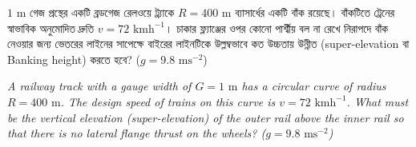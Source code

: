 \documentclass[12pt, a4paper]{article}
\begin{document}
\vspace{1em}
\begin{tcolorbox}[questionbox={প্রশ্ন (Question) 23}]
\noindent
$1\text{ m}$ গেজ প্রস্থের একটি ব্রডগেজ রেলওয়ে ট্র্যাকে $R = 400\text{ m}$ ব্যাসার্ধের একটি বাঁক রয়েছে। বাঁকটিতে ট্রেনের স্বাভাবিক অনুমোদিত দ্রুতি $v = 72\text{ kmh}^{-1}$। চাকার ফ্ল্যাঞ্জের ওপর কোনো পার্শ্বীয় বল না রেখে নিরাপদে বাঁক নেওয়ার জন্য ভেতরের লাইনের সাপেক্ষে বাইরের লাইনটিকে উল্লম্বভাবে কত উচ্চতায় উন্নীত (super-elevation বা Banking height) করতে হবে? ($g = 9.8\text{ ms}^{-2}$)

\vspace{0.8em}
\begin{english}
\noindent\textit{\color{darkgray}
A railway track with a gauge width of $G = 1\text{ m}$ has a circular curve of radius $R = 400\text{ m}$. The design speed of trains on this curve is $v = 72\text{ kmh}^{-1}$. What must be the vertical elevation (super-elevation) of the outer rail above the inner rail so that there is no lateral flange thrust on the wheels? ($g = 9.8\text{ ms}^{-2}$)
}
\end{english}
\end{tcolorbox}
\end{document}
